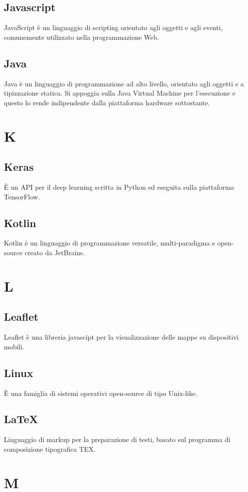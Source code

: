 \subsection{Javascript} JavaScript è un linguaggio di scripting orientato agli oggetti e agli eventi, comunemente utilizzato nella programmazione Web.
\subsection{Java} Java è un linguaggio di programmazione ad alto livello, orientato agli oggetti e a tipizzazione statica. Si appoggia sulla Java Virtual Machine per l'esecuzione e questo lo rende indipendente dalla piattaforma hardware sottostante.
\newpage \section{K}
\subsection{Keras} È un API per il deep learning scritta in Python ed eseguita sulla piattaforma TensorFlow.
\subsection{Kotlin} Kotlin è un linguaggio di programmazione versatile, multi-paradigma e open-source creato da JetBrains.
\newpage \section{L}
\subsection{Leaflet} Leaflet è una libreria javascipt per la visualizzazione delle mappe su dispositivi mobili.
\subsection{Linux} È una famiglia di sistemi operativi open-source di tipo Unix-like.
\subsection{\LaTeX} Linguaggio di markup per la preparazione di testi, basato sul programma di composizione tipografica TEX.
\newpage \section{M}

